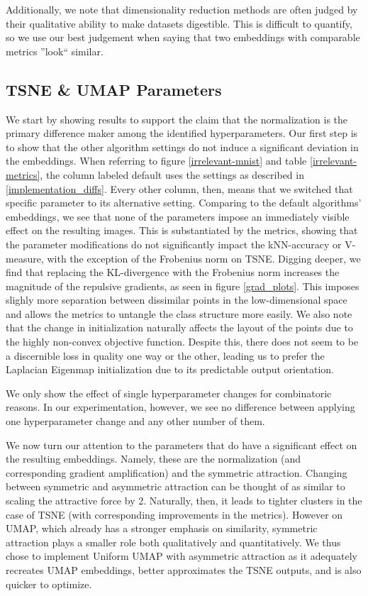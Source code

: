 \documentclass[sigconf, nonacm]{acmart}
\newcommand\ourmethod{Uniform UMAP }
\begin{document}
Additionally, we note that dimensionality reduction methods are often judged by their qualitative ability to make datasets digestible. This is difficult to
quantify, so we use our best judgement when saying that two embeddings with comparable metrics ''look`` similar.

\subsection{TSNE \& UMAP Parameters}
We start by showing results to support the claim that the normalization is the primary difference maker among the identified hyperparameters. Our first step is
to show that the other algorithm settings do not induce a significant deviation in the embeddings. When referring to figure \ref{irrelevant-mnist} and table
\ref{irrelevant-metrics}, the column labeled default uses the settings as described in \ref{implementation_diffs}. Every other column, then, means that we
switched that specific parameter to its alternative setting. Comparing to the default algorithms' embeddings, we see that
none of the parameters impose an immediately visible effect on the resulting images. This is substantiated by the metrics, showing that 
the parameter modifications do not significantly impact the kNN-accuracy or V-measure, with the exception of the Frobenius norm on TSNE. Digging deeper, we find
that replacing the KL-divergence with the Frobenius norm increases the magnitude of the repulsive gradients, as seen in figure \ref{grad_plots}. This imposes
slighly more separation between dissimilar points in the low-dimensional space and allows the metrics to untangle the class structure more easily. We also note
that the change in initialization naturally affects the layout of the points due to the highly non-convex objective function. Despite this, there does not seem
to be a discernible loss in quality one way or the other, leading us to prefer the Laplacian Eigenmap initialization due to its predictable output orientation.

We only show the effect of single hyperparameter changes for combinatoric reasons. In our experimentation, however, we see no difference between applying one
hyperparameter change and any other number of them.

We now turn our attention to the parameters that do have a significant effect on the resulting embeddings. Namely, these are the normalization (and
corresponding gradient amplification) and the symmetric attraction. Changing between symmetric and asymmetric attraction can be thought of as similar to scaling
the attractive force by 2. Naturally, then, it leads to tighter clusters in the case of TSNE (with corresponding improvements in the metrics). However on UMAP, which
already has a stronger emphasis on similarity, symmetric attraction plays a smaller role both qualitatively and quantitatively. We thus chose to implement
\ourmethod with asymmetric attraction as it adequately recreates UMAP embeddings, better approximates the TSNE outputs, and is also quicker to optimize.
\end{document}
